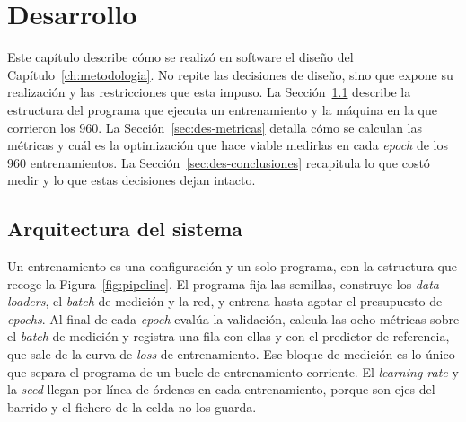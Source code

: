 \chapter{Desarrollo}
\label{ch:desarrollo}

Este capítulo describe cómo se realizó en software el diseño del Capítulo~\ref{ch:metodologia}. No repite las decisiones de diseño, sino que expone su realización y las restricciones que esta impuso. La Sección~\ref{sec:pipeline} describe la estructura del programa que ejecuta un entrenamiento y la máquina en la que corrieron los 960. La Sección~\ref{sec:des-metricas} detalla cómo se calculan las métricas y cuál es la optimización que hace viable medirlas en cada \emph{epoch} de los 960 entrenamientos. La Sección~\ref{sec:des-conclusiones} recapitula lo que costó medir y lo que estas decisiones dejan intacto.

\section{Arquitectura del sistema}
\label{sec:pipeline}

Un entrenamiento es una configuración y un solo programa, con la estructura que recoge la Figura~\ref{fig:pipeline}. El programa fija las semillas, construye los \emph{data loaders}, el \emph{batch} de medición y la red, y entrena hasta agotar el presupuesto de \emph{epochs}. Al final de cada \emph{epoch} evalúa la validación, calcula las ocho métricas sobre el \emph{batch} de medición y registra una fila con ellas y con el predictor de referencia, que sale de la curva de \emph{loss} de entrenamiento. Ese bloque de medición es lo único que separa el programa de un bucle de entrenamiento corriente. El \emph{learning rate} y la \emph{seed} llegan por línea de órdenes en cada entrenamiento, porque son ejes del barrido y el fichero de la celda no los guarda.

